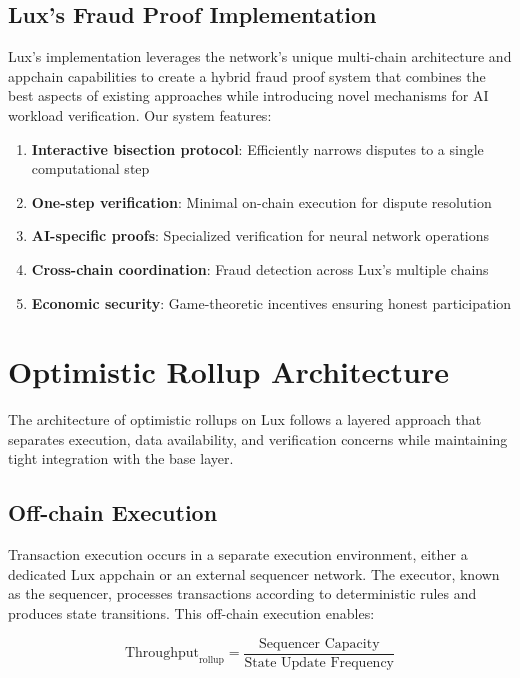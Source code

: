 \documentclass[11pt,a4paper]{article}
\theoremstyle{definition}
\begin{document}
\subsection{Lux's Fraud Proof Implementation}

Lux's implementation leverages the network's unique multi-chain architecture and appchain capabilities to create a hybrid fraud proof system that combines the best aspects of existing approaches while introducing novel mechanisms for AI workload verification. Our system features:

\begin{enumerate}
    \item \textbf{Interactive bisection protocol}: Efficiently narrows disputes to a single computational step
    \item \textbf{One-step verification}: Minimal on-chain execution for dispute resolution
    \item \textbf{AI-specific proofs}: Specialized verification for neural network operations
    \item \textbf{Cross-chain coordination}: Fraud detection across Lux's multiple chains
    \item \textbf{Economic security}: Game-theoretic incentives ensuring honest participation
\end{enumerate}

\section{Optimistic Rollup Architecture}

The architecture of optimistic rollups on Lux follows a layered approach that separates execution, data availability, and verification concerns while maintaining tight integration with the base layer.

\subsection{Off-chain Execution}

Transaction execution occurs in a separate execution environment, either a dedicated Lux appchain or an external sequencer network. The executor, known as the sequencer, processes transactions according to deterministic rules and produces state transitions. This off-chain execution enables:

\begin{equation}
\text{Throughput}_{\text{rollup}} = \frac{\text{Sequencer Capacity}}{\text{State Update Frequency}}
\end{equation}
\end{document}
